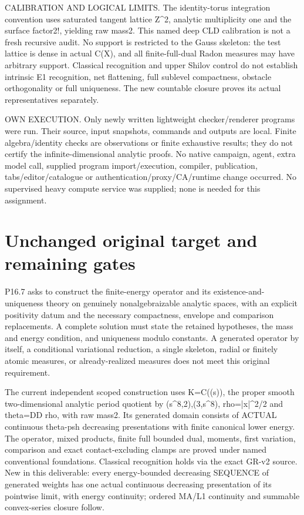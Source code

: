 \documentclass[11pt]{article}
\begin{document}
CALIBRATION AND LOGICAL LIMITS. The identity-torus integration convention uses saturated tangent lattice Z\textasciicircum{}2, analytic multiplicity one and the surface factor2!, yielding raw mass2. This named deep CLD calibration is not a fresh recursive audit. No support is restricted to the Gauss skeleton: the test lattice is dense in actual C(X), and all finite-full-dual Radon measures may have arbitrary support. Classical recognition and upper Shilov control do not establish intrinsic E1 recognition, net flattening, full sublevel compactness, obstacle orthogonality or full uniqueness. The new countable closure proves its actual representatives separately.

OWN EXECUTION. Only newly written lightweight checker/renderer programs were run. Their source, input snapshots, commands and outputs are local. Finite algebra/identity checks are observations or finite exhaustive results; they do not certify the infinite-dimensional analytic proofs. No native campaign, agent, extra model call, supplied program import/execution, compiler, publication, tabs/editor/catalogue or authentication/proxy/CA/runtime change occurred. No supervised heavy compute service was supplied; none is needed for this assignment.

\section*{Unchanged original target and remaining gates}

P16.7 asks to construct the finite-energy operator and its existence-and-uniqueness theory on genuinely nonalgebraizable analytic spaces, with an explicit positivity datum and the necessary compactness, envelope and comparison replacements. A complete solution must state the retained hypotheses, the mass and energy condition, and uniqueness modulo constants. A generated operator by itself, a conditional variational reduction, a single skeleton, radial or finitely atomic measures, or already-realized measures does not meet this original requirement.

The current independent scoped construction uses K=C((s)), the proper smooth two-dimensional analytic period quotient by (s\textasciicircum{}8,2),(3,s\textasciicircum{}8), rho=|x|\textasciicircum{}2/2 and theta=DD rho, with raw mass2. Its generated domain consists of ACTUAL continuous theta-psh decreasing presentations with finite canonical lower energy. The operator, mixed products, finite full bounded dual, moments, first variation, comparison and exact contact-excluding clamps are proved under named conventional foundations. Classical recognition holds via the exact GR-v2 source. New in this deliverable: every energy-bounded decreasing SEQUENCE of generated weights has one actual continuous decreasing presentation of its pointwise limit, with energy continuity; ordered MA/L1 continuity and summable convex-series closure follow.
\end{document}
